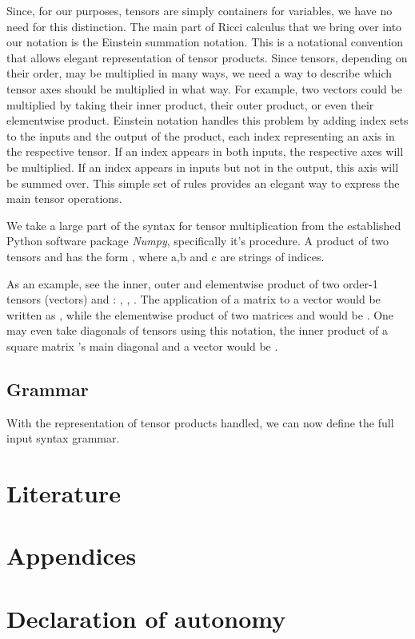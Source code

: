 \documentclass[12pt, a4paper]{report}
\begin{document}
Since, for our purposes, tensors are simply containers for variables, we have no need for this distinction.
The main part of Ricci calculus that we bring over into our notation is the Einstein summation notation.
This is a notational convention that allows elegant representation of tensor products.
Since tensors, depending on their order, may be multiplied in many ways, we need a way to describe which tensor axes should be multiplied in what way.
For example, two vectors could be multiplied by taking their inner product, their outer product, or even their elementwise product.
Einstein notation handles this problem by adding index sets to the inputs and the output of the product, each index representing an axis in the respective tensor.
If an index appears in both inputs, the respective axes will be multiplied.
If an index appears in inputs but not in the output, this axis will be summed over.
This simple set of rules provides an elegant way to express the main tensor operations.

We take a large part of the syntax for tensor multiplication from the established Python software package \textit{Numpy}, specifically it's  procedure.
A product of two tensors  and  has the form , where a,b and c are strings of indices.

As an example, see the inner, outer and elementwise product of two order-1 tensors (vectors)  and : , , .
The application of a matrix  to a vector  would be written as , while the elementwise product of two matrices  and  would be .
One may even take diagonals of tensors using this notation, the inner product of a square matrix 's main diagonal and a vector  would be .


\section {Grammar}
With the representation of tensor products handled, we can now define the full input syntax grammar.

\chapter{Literature}
\chapter{Appendices}
\chapter{Declaration of autonomy}
\end{document}

